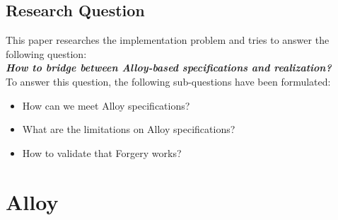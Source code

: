 \documentclass[oneside]{book}
\begin{document}

\section{Research Question}

This paper researches the implementation problem and tries to answer the following question:\\

\textit{\textbf{How to bridge between Alloy-based specifications and realization?}}\\

To answer this question, the following sub-questions have been formulated:
\begin{itemize}
  \item How can we meet Alloy specifications?
  \item What are the limitations on Alloy specifications?
  \item How to validate that Forgery works?
\end{itemize}

\newpage

\chapter{Alloy}
\end{document}
